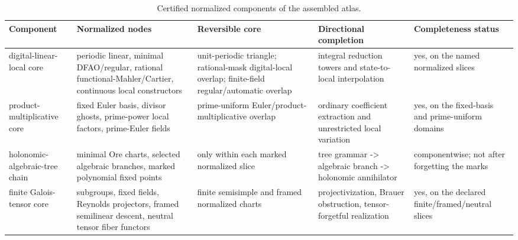 \begin{table}[htbp]
\centering
\caption{Certified normalized components of the assembled atlas.}
\label{tab:block13-components}
\scriptsize
\begin{tabularx}{\textwidth}{@{}L{0.17\textwidth}L{0.23\textwidth}L{0.23\textwidth}L{0.20\textwidth}Y@{}}
\toprule
Component & Normalized nodes & Reversible core & Directional completion & Completeness status\\
\midrule
digital-linear-local core & periodic linear, minimal DFAO/regular, rational functional-Mahler/Cartier, continuous local constructors & unit-periodic triangle; rational-mask digital-local overlap; finite-field regular/automatic overlap & integral reduction towers and state-to-local interpolation & yes, on the named normalized slices\\
product-multiplicative core & fixed Euler basis, divisor ghosts, prime-power local factors, prime-Euler fields & prime-uniform Euler/product-multiplicative overlap & ordinary coefficient extraction and unrestricted local variation & yes, on the fixed-basis and prime-uniform domains\\
holonomic-algebraic-tree chain & minimal Ore charts, selected algebraic branches, marked polynomial fixed points & only within each marked normalized slice & tree grammar -> algebraic branch -> holonomic annihilator & componentwise; not after forgetting the marks\\
finite Galois-tensor core & subgroups, fixed fields, Reynolds projectors, framed semilinear descent, neutral tensor fiber functors & finite semisimple and framed normalized charts & projectivization, Brauer obstruction, tensor-forgetful realization & yes, on the declared finite/framed/neutral slices\\
\bottomrule
\end{tabularx}
\end{table}

